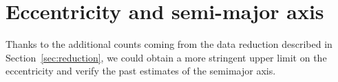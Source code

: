 \documentclass[twocolumn]{aastex631}
\newcommand{\tasc}{\ensuremath{T_{\rm asc}{}}}
\newcommand{\secref}{Section~\ref}
\begin{document}

\section{Eccentricity and semi-major axis}\label{sec:ecc}
Thanks to the additional counts coming from the data reduction described in \secref{sec:reduction}, we could obtain a more stringent upper limit on the eccentricity and verify the past estimates of the semimajor axis.
\end{document}
